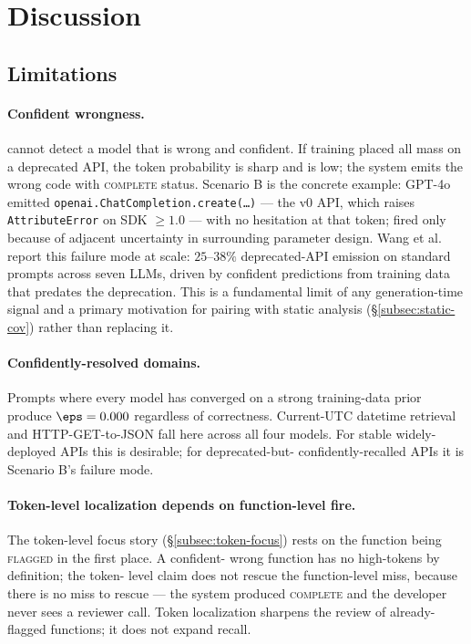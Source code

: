 \section{Discussion}
\label{sec:discussion}

\subsection{Limitations}
\label{subsec:limitations}

\paragraph{Confident wrongness.} \eps cannot detect a model that is
wrong and confident. If training placed all mass on a deprecated API,
the token probability is sharp and \eps is low; the system emits the
wrong code with \textsc{complete} status. Scenario B is the
concrete example: GPT-4o emitted
\texttt{openai.ChatCompletion.create(\ldots)} --- the v0 API, which
raises \texttt{AttributeError} on SDK $\ge 1.0$ --- with no
hesitation at that token; \eps fired only because of adjacent
uncertainty in surrounding parameter design. Wang et
al.~\cite{wang2025deprecated} report this failure mode at scale:
$25$--$38\%$ deprecated-API emission on standard prompts across
seven LLMs, driven by confident predictions from training data that
predates the deprecation. This is a fundamental limit of any
generation-time signal and a primary motivation for pairing \eps
with static analysis (\S\ref{subsec:static-cov}) rather than
replacing it.

\paragraph{Confidently-resolved domains.} Prompts where every model
has converged on a strong training-data prior produce $\eps = 0.000$
regardless of correctness. Current-UTC datetime retrieval and
HTTP-GET-to-JSON fall here across all four models. For stable
widely-deployed APIs this is desirable; for deprecated-but-%
confidently-recalled APIs it is Scenario B's failure mode.

\paragraph{Token-level localization depends on function-level fire.}
The token-level focus story (\S\ref{subsec:token-focus}) rests on
the function being \textsc{flagged} in the first place. A confident-%
wrong function has no high-\eps tokens by definition; the token-%
level claim does not rescue the function-level miss, because there
is no miss to rescue --- the system produced \textsc{complete} and
the developer never sees a reviewer call. Token localization
sharpens the review of already-flagged functions; it does not expand
recall.


